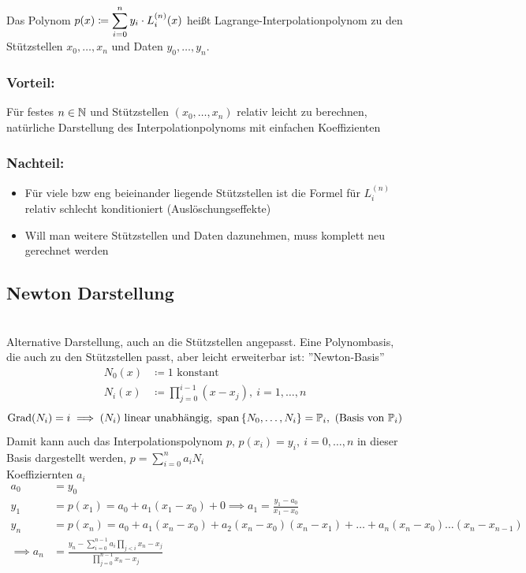 \documentclass[../Skript.tex]{subfiles}
\begin{document}
\begin{definition}
    Das Polynom $p(x)\coloneqq \displaystyle\sum_{i=0}^n y_i\cdot L_i^{(n)}(x)$ heißt Lagrange-Interpolationpolynom
    zu den Stützstellen $x_0,\dots,x_n$ und Daten $y_0,\dots,y_n$.
\end{definition}
\subsubsection*{Vorteil:}
Für festes $n\in \mathbb{N}$ und Stützstellen $(x_0,\dots, x_n)$ relativ leicht zu berechnen, natürliche Darstellung des 
Interpolationpolynoms mit einfachen Koeffizienten
\subsubsection*{Nachteil:}
\begin{itemize}
    \item Für viele bzw eng beieinander liegende Stützstellen ist die Formel für $L_i^{(n)}$ relativ schlecht konditioniert 
    (Auslöschungseffekte)
    \item Will man weitere Stützstellen und Daten dazunehmen, muss komplett neu gerechnet werden
\end{itemize}
\subsection{Newton Darstellung}\hfill\\
Alternative Darstellung, auch an die Stützstellen angepasst.
Eine Polynombasis, die auch zu den Stützstellen passt, aber leicht erweiterbar ist: ''Newton-Basis''
\begin{align*}
    N_0(x) &\coloneqq 1 \text{ konstant}\\
    N_i(x) &\coloneqq \displaystyle\prod_{j=0}^{i-1}(x-x_j), \ i=1,\dots,n
\end{align*}
\[
    \text{Grad}(N_i) = i \implies (N_i) \text{ linear unabhängig},\ \operatorname{span}{\left\{ N_0,\dots,N_i \right\}} = \mathbb{P}_i, \text{ (Basis von }\mathbb{P}_i)
\]
Damit kann auch das Interpolationspolynom $p$, $p(x_i)=y_i, \ i=0,\dots,n$ in dieser Basis dargestellt werden, 
$p=\sum^n_{i=0}a_iN_i$\\
Koeffiziernten $a_i$
\begin{align*}
a_0&= y_0 &&\ \\
y_1&= p(x_1) =a_0+a_1(x_1-x_0)+0 \implies a_1=\frac{y_1-a_0}{x_1-x_0} \\
y_n&= p(x_n) =a_0+a_1(x_n-x_0)+a_2(x_n-x_0)(x_n-x_1)+\dots+ a_n(x_n-x_0)\dots(x_n-x_{n-1})\\ \implies a_n&= \frac{y_n-
\sum^{n-1}_{i=0}a_i\prod_{j<i}x_n-x_j}{\prod^{n-1}_{j=0}x_n-x_j} 
\end{align*}
\end{document}
